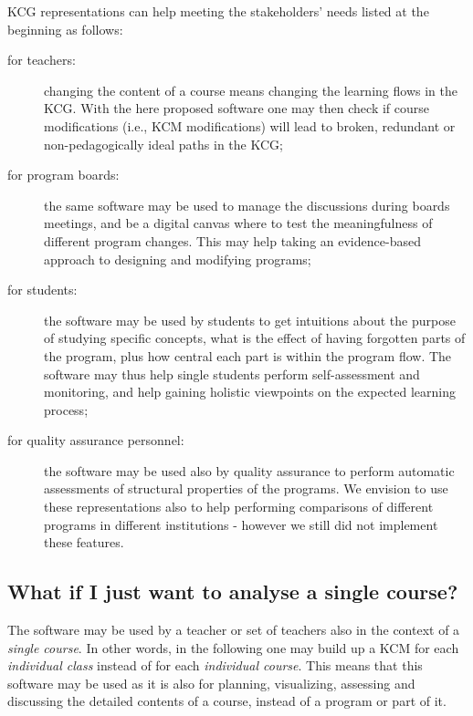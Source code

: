 \ac{KCG} representations can help meeting the stakeholders' needs listed at the beginning as follows:
%
\begin{description}
	\item[for teachers:] changing the content of a course means changing the learning flows in the \ac{KCG}. With the here proposed software one may then check if course modifications (i.e., \ac{KCM} modifications) will lead to broken, redundant or non-pedagogically ideal paths in the \ac{KCG};
	\item[for program boards:] the same software may be used to manage the discussions during boards meetings, and be a digital canvas where to test the meaningfulness of different program changes. This may help taking an evidence-based approach to designing and modifying programs;
	\item[for students:] the software may be used by students to get intuitions about the purpose of studying specific concepts, what is the effect of having forgotten parts of the program, plus how central each part is within the program flow. The software may thus help single students perform self-assessment and monitoring, and help gaining holistic viewpoints on the expected learning process;
	\item[for quality assurance personnel:] the software may be used also by quality assurance to perform automatic assessments of structural properties of the programs. We envision to use these representations also to help performing comparisons of different programs in different institutions - however we still did not implement these features.
\end{description}



\subsection{What if I just want to analyse a single course?}

The software may be used by a teacher or set of teachers also in the context of a \emph{single course}. In other words, in the following one may build up a \ac{KCM} for each \emph{individual class} instead of for each \emph{individual course}. This means that this software may be used as it is also for planning, visualizing, assessing and discussing the detailed contents of a course, instead of a program or part of it.


